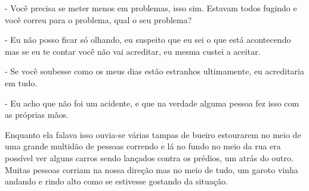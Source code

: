 - Você precisa se meter menos em problemas, isso sim. Estavam todos fugindo e você correu para o problema, qual o seu problema?

- Eu não posso ficar só olhando, eu suspeito que eu sei o que está acontecendo mas se eu te contar você não vai acreditar, eu mesma custei a aceitar.

- Se você soubesse como os meus dias estão estranhos ultimamente, eu acreditaria em tudo.

- Eu acho que não foi um acidente, e que na verdade alguma pessoa fez isso com as próprias mãos.

Enquanto ela falava isso ouvia-se várias tampas de bueiro estourarem no meio de uma grande multidão de pessoas correndo e lá no fundo no meio da rua era possível ver alguns carros sendo lançados contra os prédios, um atrás do outro. Muitas pessoas corriam na nossa direção mas no meio de tudo, um garoto vinha andando e rindo alto como se estivesse gostando da situação.